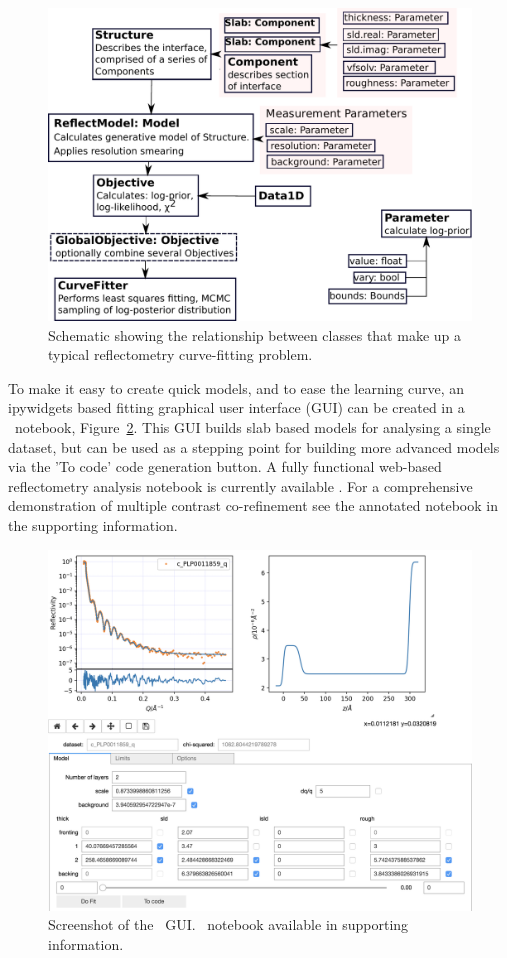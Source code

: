 \documentclass[12pt]{article}
\begin{document}
\begin{figure}
  \includegraphics[width=\linewidth]{components}
  \caption{Schematic showing the relationship between classes that make up a typical reflectometry curve-fitting problem.}
  \label{fig:components}
\end{figure}

To make it easy to create quick models, and to ease the learning curve, an ipywidgets \cite{ipywidgets} based fitting graphical user interface (GUI) can be created in a \Jupyter\ notebook, Figure~\ref{fig:gui}. This GUI builds slab based models for analysing a single dataset, but can be used as a stepping point for building more advanced models via the 'To code' code generation button. A fully functional web-based reflectometry analysis notebook is currently available \cite{Nelson2018}. For a comprehensive demonstration of multiple contrast co-refinement see the annotated notebook in the supporting information.

\begin{figure}
  \includegraphics[width=\linewidth]{./supporting_information/gui.png}
  \caption{Screenshot of the \Jupyter\/\ipywidgets\ GUI. \Jupyter\ notebook available in supporting information.}
  \label{fig:gui}
\end{figure}
\end{document}
